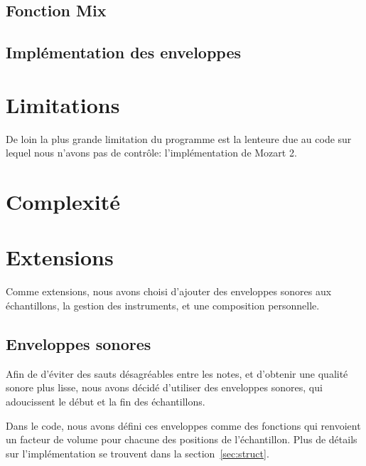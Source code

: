 \documentclass[a4paper,12pt]{article}
\begin{document}
\subsection{Fonction Mix}

\subsection{Implémentation des enveloppes}

\section{Limitations}

De loin la plus grande limitation du programme est la lenteure due au code sur lequel nous n'avons pas de contrôle: l'implémentation de Mozart 2.

\section{Complexité}

\section{Extensions}

Comme extensions, nous avons choisi d'ajouter des enveloppes sonores
aux échantillons, la gestion des instruments, et une composition personnelle.

\subsection{Enveloppes sonores}
\label{sec:enveloppes}
Afin de d'éviter des sauts désagréables entre les notes,
et d'obtenir une qualité sonore plus lisse,
nous avons décidé d'utiliser des enveloppes sonores,
qui adoucissent le début et la fin des échantillons.

Dans le code, nous avons défini ces enveloppes comme des fonctions
qui renvoient un facteur de volume pour chacune des positions
de l'échantillon.
Plus de détails sur l'implémentation se trouvent
dans la section~\ref{sec:struct}.
\end{document}
